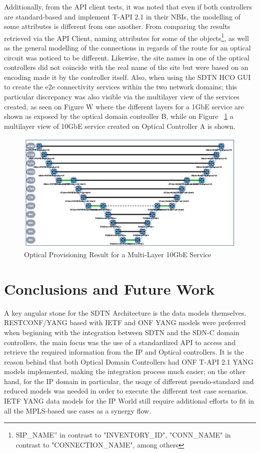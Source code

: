 \documentclass[a4paper,fleqn]{cas-dc}
\begin{document}
Additionally, from the API client tests, it was noted that even if both controllers are standard-based and implement T-API 2.1 in their NBIs, the modelling of some attributes is different from one another. From comparing the results retrieved via the API Client, naming attributes for some of the objects\footnote{SIP\_NAME” in contrast to "INVENTORY\_ID", "CONN\_NAME" in contrast to "CONNECTION\_NAME", among others}, as well as the general modelling of the connections in regards of the route for an optical circuit was noticed to be different. Likewise, the site names in one of the optical controllers did not coincide with the real name of the site but were based on an encoding made it by the controller itself. Also, when using the SDTN HCO GUI to create the e2e connectivity services within the two network domains; this particular discrepancy was also visible via the multilayer view of the services created, as seen on Figure W where the different layers for a 1GbE service are shown as exposed by the optical domain controller B, while on Figure ~\ref{FIG:optical_provisioning_result} a multilayer view of 10GbE service created on Optical Controller A is shown.

\begin{figure}
	\centering
		\includegraphics[width=\linewidth]{figs/optical_provisioning_result.png}
	\caption{Optical Provisioning Result for a Multi-Layer 10GbE Service}
	\label{FIG:optical_provisioning_result}
\end{figure}

\section{Conclusions and Future Work}
\label{section:conclusions}
A key angular stone for the SDTN Architecture is the data models themselves. RESTCONF/YANG based with IETF and ONF YANG models were preferred when beginning with the integration between SDTN and the SDN-C domain controllers, the main focus was the use of a standardized API to access and retrieve the required information from the IP and Optical controllers. It is the reason behind that both Optical Domain Controllers had ONF T-API 2.1 YANG models implemented, making the integration process much easier; on the other hand, for the IP domain in particular, the usage of different pseudo-standard and reduced models was needed in order to execute the different test case scenarios. IETF YANG data models for the IP World still require additional efforts to fit in all the MPLS-based use cases as a synergy flow. 
\end{document}
